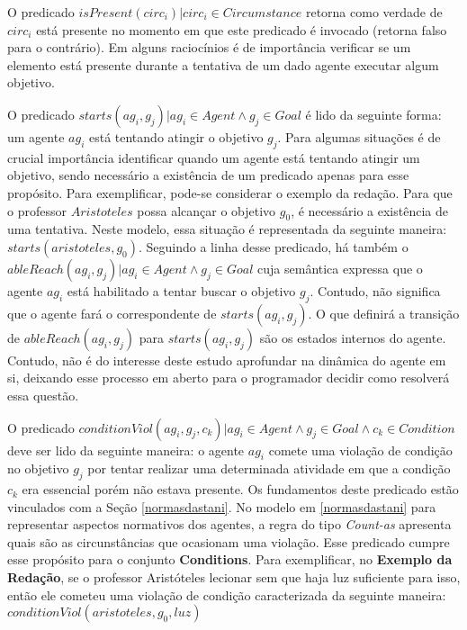 O predicado $isPresent(circ_i) | circ_i \in Circumstance $ retorna como verdade de $circ_i$ está presente no momento em que este predicado é invocado (retorna falso para o contrário). Em alguns raciocínios é de importância verificar se um elemento está presente durante a tentativa de um dado agente executar algum objetivo.

O predicado $starts(ag_i,g_j) | ag_i \in Agent \wedge g_j \in Goal $ é lido da seguinte forma: um agente $ag_i$ está tentando atingir o objetivo $g_j$. Para algumas situações é de crucial importância identificar quando um agente está tentando atingir um objetivo, sendo necessário a existência de um predicado apenas para esse propósito. Para exemplificar, pode-se considerar o exemplo da redação. Para que o professor $Aristoteles$ possa alcançar o objetivo $g_0$, é necessário a existência de uma tentativa. Neste modelo, essa situação é representada da seguinte maneira: $starts(aristoteles,g_0)$. Seguindo a linha desse predicado, há também o $ableReach(ag_i,g_j) | ag_i \in Agent \wedge g_j \in Goal$ cuja semântica expressa que o agente $ag_i$ está habilitado a tentar buscar o objetivo $g_j$. Contudo, não significa que o agente fará o correspondente de $starts(ag_i,g_j)$. O que definirá a transição de $ableReach(ag_i,g_j)$ para $starts(ag_i,g_j)$ são os estados internos do agente. Contudo, não é do interesse deste estudo aprofundar na dinâmica do agente em si, deixando esse processo em aberto para o programador decidir como resolverá essa questão.

O predicado $ conditionViol(ag_i,g_j,c_k) | ag_i \in Agent \wedge g_j \in Goal \wedge c_k \in Condition$ deve ser lido da seguinte maneira: o agente $ag_i$ comete uma violação de condição no objetivo $g_j$ por tentar realizar uma determinada atividade em que a condição $c_k$ era essencial porém não estava presente. Os fundamentos deste predicado estão vinculados com a Seção \ref{normasdastani}. No modelo em \ref{normasdastani} para representar aspectos normativos dos agentes, a regra do tipo \textit{Count-as} apresenta quais são as circunstâncias que ocasionam uma violação. Esse predicado cumpre esse propósito para o conjunto \textbf{Conditions}. Para exemplificar, no \textbf{Exemplo da Redação}, se o professor Aristóteles lecionar sem que haja luz suficiente para isso, então ele cometeu uma violação de condição caracterizada da seguinte maneira: $conditionViol(aristoteles,g_0,luz)$


